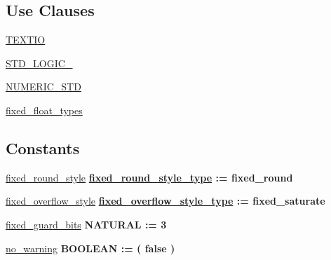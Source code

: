 \subsection*{Use Clauses}
 \begin{DoxyCompactItemize}
\item 
\hyperlink{classfixed__pkg_acc9bb15afb72fddf1ed02435602a9843}{T\+E\+X\+T\+I\+O}   
\item 
\hyperlink{classfixed__pkg_aa4b2b25246a821511120e3149b003563}{S\+T\+D\+\_\+\+L\+O\+G\+I\+C\+\_}   
\item 
\hyperlink{classfixed__pkg_ae00f3f04545af57582ff10609eee23e2}{N\+U\+M\+E\+R\+I\+C\+\_\+\+S\+T\+D}   
\item 
\hyperlink{classfixed__pkg_a824691d871b9db6a0485012e2e32bd88}{fixed\+\_\+float\+\_\+types}   
\end{DoxyCompactItemize}
\subsection*{Constants}
 \begin{DoxyCompactItemize}
\item 
\hyperlink{classfixed__pkg_aba8efbe8f71b626e5891bb42e09b43b0}{fixed\+\_\+round\+\_\+style} {\bfseries {\bfseries \hyperlink{classfixed__float__types_a531b370a8acfecdccebf696cf0d2d971}{fixed\+\_\+round\+\_\+style\+\_\+type}} \textcolor{vhdlchar}{ }\textcolor{vhdlchar}{ }\textcolor{vhdlchar}{\+:}\textcolor{vhdlchar}{=}\textcolor{vhdlchar}{ }\textcolor{vhdlchar}{ }\textcolor{vhdlchar}{ }\textcolor{vhdlchar}{ }\textcolor{vhdlchar}{fixed\+\_\+round}\textcolor{vhdlchar}{ }} 
\item 
\hyperlink{classfixed__pkg_ad6d57c2cf38edf44908e831debe98d4d}{fixed\+\_\+overflow\+\_\+style} {\bfseries {\bfseries \hyperlink{classfixed__float__types_a8a8b6b0022e693377949251b05ac846a}{fixed\+\_\+overflow\+\_\+style\+\_\+type}} \textcolor{vhdlchar}{ }\textcolor{vhdlchar}{ }\textcolor{vhdlchar}{\+:}\textcolor{vhdlchar}{=}\textcolor{vhdlchar}{ }\textcolor{vhdlchar}{ }\textcolor{vhdlchar}{ }\textcolor{vhdlchar}{ }\textcolor{vhdlchar}{fixed\+\_\+saturate}\textcolor{vhdlchar}{ }} 
\item 
\hyperlink{classfixed__pkg_a4d5c43156a957978fffb4261e4d78ff1}{fixed\+\_\+guard\+\_\+bits} {\bfseries \textcolor{comment}{N\+A\+T\+U\+R\+A\+L}\textcolor{vhdlchar}{ }\textcolor{vhdlchar}{ }\textcolor{vhdlchar}{\+:}\textcolor{vhdlchar}{=}\textcolor{vhdlchar}{ }\textcolor{vhdlchar}{ } \textcolor{vhdldigit}{3} \textcolor{vhdlchar}{ }} 
\item 
\hyperlink{classfixed__pkg_a3db256b7160d4b00878f2ae8d22e399e}{no\+\_\+warning} {\bfseries \textcolor{comment}{B\+O\+O\+L\+E\+A\+N}\textcolor{vhdlchar}{ }\textcolor{vhdlchar}{ }\textcolor{vhdlchar}{\+:}\textcolor{vhdlchar}{=}\textcolor{vhdlchar}{ }\textcolor{vhdlchar}{(}\textcolor{vhdlchar}{ }\textcolor{vhdlchar}{ }\textcolor{vhdlchar}{ }\textcolor{vhdlchar}{ }\textcolor{vhdlchar}{false}\textcolor{vhdlchar}{ }\textcolor{vhdlchar}{)}\textcolor{vhdlchar}{ }} 
\end{DoxyCompactItemize}
